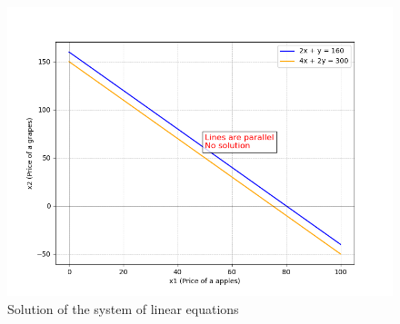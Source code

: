 \documentclass[journal]{IEEEtran}
\begin{document}
	\begin{figure}[h!]
		\centering
		\includegraphics[width=\columnwidth]{figs/fig1.png}
		\caption{Solution of the system of linear equations}
		\label{stemplot}
	\end{figure}
	
\end{document}
